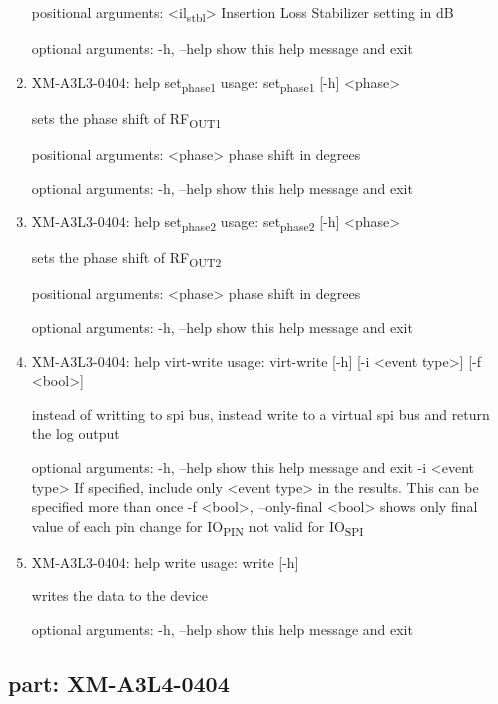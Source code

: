 \documentclass[11pt]{article}
\begin{document}
\begin{enumerate}
positional arguments:
  <il\textsubscript{stbl}>   Insertion Loss Stabilizer setting in dB

optional arguments:
  -h, --help  show this help message and exit

\item XM-A3L3-0404: help set\textsubscript{phase}\textsubscript{1}
\label{sec:orgd9e071f}
usage: set\textsubscript{phase}\textsubscript{1} [-h] <phase>

sets the phase shift of RF\textsubscript{OUT1}

positional arguments:
  <phase>     phase shift in degrees

optional arguments:
  -h, --help  show this help message and exit

\item XM-A3L3-0404: help set\textsubscript{phase}\textsubscript{2}
\label{sec:orgee64871}
usage: set\textsubscript{phase}\textsubscript{2} [-h] <phase>

sets the phase shift of RF\textsubscript{OUT2}

positional arguments:
  <phase>     phase shift in degrees

optional arguments:
  -h, --help  show this help message and exit

\item XM-A3L3-0404: help virt-write
\label{sec:orgc2969f3}
usage: virt-write [-h] [-i <event type>] [-f <bool>]

instead of writting to spi bus, instead write to a virtual spi bus and return
the log output

optional arguments:
  -h, --help            show this help message and exit
  -i <event type>       If specified, include only <event type> in the
                        results. This can be specified more than once
  -f <bool>, --only-final <bool>
                        shows only final value of each pin change for IO\textsubscript{PIN}
                        not valid for IO\textsubscript{SPI}

\item XM-A3L3-0404: help write
\label{sec:org001b598}
usage: write [-h]

writes the data to the device

optional arguments:
  -h, --help  show this help message and exit
\end{enumerate}

\subsection{part: XM-A3L4-0404}
\label{sec:org3a82441}
\end{document}
